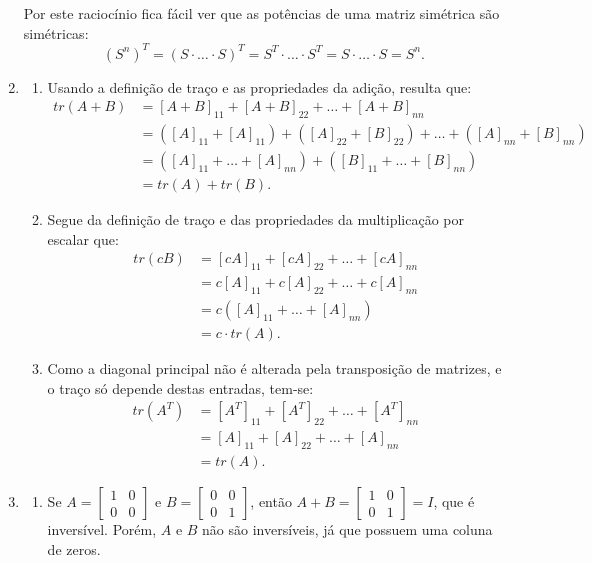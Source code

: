 \documentclass[12pt,a4paper]{article}
\begin{document}
\begin{enumerate}
Por este raciocínio fica fácil ver que as potências de uma matriz simétrica são simétricas:
\[
(S^n)^T
= (S \cdot \ldots \cdot S)^T
= S^T \cdot \ldots \cdot S^T
= S \cdot \ldots \cdot S = S^n.
\]

\item
\begin{enumerate}
\item Usando a definição de traço e as propriedades da adição, resulta que:
\begin{align*}
tr(A+B)
& = [A+B]_{11} + [A+B]_{22} + \ldots + [A+B]_{nn} \\
& = ([A]_{11} + [A]_{11}) + ([A]_{22} + [B]_{22}) + \ldots + ([A]_{nn} + [B]_{nn}) \\
& = ([A]_{11} + \dots + [A]_{nn}) + ([B]_{11} + \ldots + [B]_{nn})\\
& = tr(A)+tr(B).
\end{align*}
\item Segue da definição de traço e das propriedades da multiplicação por escalar que:
\begin{align*}
tr(cB)
& = [cA]_{11} + [cA]_{22} + \ldots + [cA]_{nn} \\
& = c[A]_{11} + c[A]_{22} + \ldots + c[A]_{nn} \\
& = c([A]_{11} + \dots + [A]_{nn}) \\
& = c \cdot tr(A).
\end{align*}
\item Como a diagonal principal não é alterada pela transposição de matrizes, e o traço só depende destas entradas, tem-se:
\begin{align*}
tr(A^T)
& = [A^T]_{11} + [A^T]_{22} + \ldots + [A^T]_{nn} \\
& = [A]_{11} + [A]_{22} + \ldots + [A]_{nn} \\
& = tr(A).
\end{align*}
\end{enumerate}
\item
\begin{enumerate}
\item Se
$A = \begin{bmatrix}
1 & 0 \\
0 & 0
\end{bmatrix}$
e 
$B = \begin{bmatrix}
0 & 0 \\
0 & 1
\end{bmatrix}$, então
$A + B
= \begin{bmatrix}
1 & 0 \\
0 & 1
\end{bmatrix} = I$, que é inversível. Porém, $A$ e $B$ não são inversíveis, já que possuem uma coluna de zeros.


\end{enumerate}
\end{enumerate}
\end{document}
